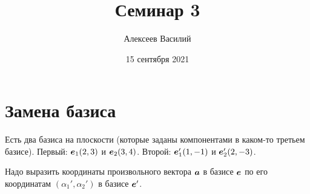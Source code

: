 \documentclass[a4paper,12pt]{article}
\author{Алексеев Василий}
\title{Семинар 3}
\date{15 сентября 2021}
\begin{document}
  \maketitle
  
  \tableofcontents

  \thispagestyle{empty}
  
  \newpage
  


  \section{Замена базиса}
  
  \begin{problem}[4.7]
    Есть два базиса на плоскости (которые заданы компонентами в каком-то третьем базисе).
    Первый: $\boldsymbol e_1(2, 3)$ и $\boldsymbol e_2(3, 4)$.
    Второй: $\boldsymbol e_1'(1, -1)$ и $\boldsymbol e_2'(2, -3)$.
    
    Надо выразить координаты произвольного вектора $\boldsymbol a$ в базисе $\boldsymbol e$ по его координатам $(\alpha_1', \alpha_2')$ в базисе $\boldsymbol e'$.
  \end{problem}
  
\end{document}

